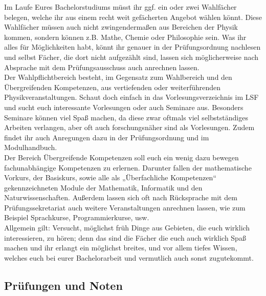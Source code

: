 Im Laufe Eures Bachelorstudiums müsst ihr ggf. ein oder zwei Wahlfächer belegen, welche ihr aus einem recht weit gefächerten Angebot wählen könnt. Diese Wahlfächer müssen auch nicht zwingendermaßen aus Bereichen der Physik kommen, sondern können z.B. Mathe, Chemie oder Philosophie sein. Was ihr alles für Möglichkeiten habt, könnt ihr genauer in der Prüfungsordnung nachlesen und selbst Fächer, die dort nicht aufgezählt sind, lassen sich möglicherweise nach Absprache mit dem Prüfungsausschuss auch anrechnen lassen.\\

Der Wahlpflichtbereich besteht, im Gegensatz zum Wahlbereich und den Übergreifenden Kompetenzen, aus vertiefenden oder weiterführenden Physikveranstaltungen. Schaut doch einfach in das Vorlesungsverzeichnis im LSF und sucht euch interessante Vorlesungen oder auch Seminare aus. Besonders Seminare können viel Spaß machen, da diese zwar oftmals viel selbstständiges Arbeiten verlangen, aber oft auch forschungsnäher sind als Vorlesungen. Zudem findet ihr auch Anregungen dazu in der Prüfungsordnung und im Modulhandbuch.\\

Der Bereich Übergreifende Kompetenzen soll euch ein wenig dazu bewegen fachunabhängige Kompetenzen zu erlernen. Darunter fallen der mathematische Vorkurs, der Basiskurs, sowie alle als „Überfachliche Kompetenzen“ gekennzeichneten Module der Mathematik, Informatik und den Naturwissenschaften. Außerdem lassen sich oft nach Rücksprache mit dem Prüfungssekretariat auch weitere Veranstaltungen anrechnen lassen, wie zum Beispiel Sprachkurse, Programmierkurse, usw.\\

Allgemein gilt: Versucht, möglichst früh Dinge aus Gebieten, die euch wirklich interessieren, zu hören; denn das sind die Fächer die euch auch wirklich Spaß machen und ihr erlangt ein möglichst breites, und vor allem tiefes Wissen, welches euch bei eurer Bachelorarbeit und vermutlich auch sonst zugutekommt.


\subsection{Prüfungen und Noten}

